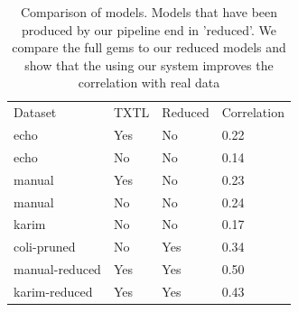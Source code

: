 \begin{table}[t]
\centering
\begin{tabular}{llll}
Dataset & TXTL & Reduced & Correlation \\
echo    & Yes   & No        & 0.22        \\
echo    & No    & No        & 0.14        \\
manual    & Yes    & No        &   0.23     \\
manual    & No   & No        &   0.24     \\
karim   & No    & No        & 0.17      \\
coli-pruned & No & Yes & 0.34 \\
manual-reduced & Yes & Yes & 0.50 \\
karim-reduced & Yes & Yes & 0.43 
\end{tabular}
\caption{Comparison of models.
Models that have been produced by our pipeline end in 'reduced'.
We compare the full \glspl{gem} to our reduced models and show that the using our system improves the correlation with real data}
\label{tab:cmp}
\end{table}


